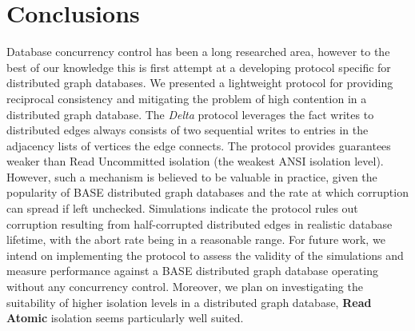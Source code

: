 \documentclass[sigplan,10pt]{acmart}
\begin{document}
\section{Conclusions}

Database concurrency control has been a long researched area, however to the best of our knowledge this is first attempt at a developing protocol specific for distributed graph databases. We presented a lightweight protocol for providing reciprocal consistency and mitigating the problem of high contention in a distributed graph database. The \emph{Delta} protocol leverages the fact writes to distributed edges always consists of two sequential writes to entries in the adjacency lists of vertices the edge connects. The protocol provides guarantees weaker than Read Uncommitted isolation (the weakest ANSI isolation level). However, such a mechanism is believed to be valuable in practice, given the popularity of BASE distributed graph databases and the rate at which corruption can spread if left unchecked. Simulations indicate the protocol rules out corruption resulting from half-corrupted distributed edges in realistic database lifetime, with the abort rate being in a reasonable range. For future work, we intend on implementing the protocol to assess the validity of the simulations and measure performance against a BASE distributed graph database operating without any concurrency control. Moreover, we plan on investigating the suitability of higher isolation levels in a distributed graph database, \textbf{Read Atomic} isolation \cite{Bailis2014} seems particularly well suited.



\end{document}
